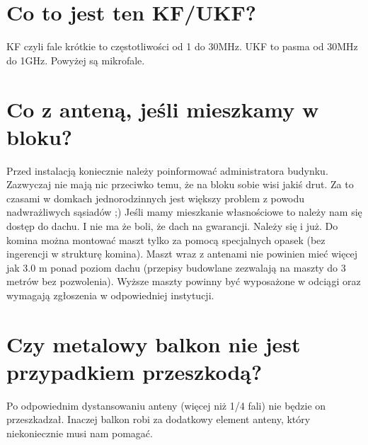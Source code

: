 \documentclass[a4paper,12pt]{article}
\begin{document}
\section{Co to jest ten KF/UKF?}
KF czyli fale krótkie to częstotliwości od 1 do 30MHz.
UKF to pasma od 30MHz do 1GHz.
Powyżej są mikrofale.

\section{Co z anteną, jeśli mieszkamy w bloku?}
Przed instalacją koniecznie należy poinformować administratora budynku. Zazwyczaj nie mają nic przeciwko temu, że na bloku sobie wisi jakiś drut. Za to czasami w domkach jednorodzinnych jest większy problem z powodu nadwrażliwych sąsiadów ;)
Jeśli mamy mieszkanie własnościowe to należy nam się dostęp do dachu. I nie ma że boli, że dach na gwarancji. Należy się i już.
Do komina można montować maszt tylko za pomocą specjalnych opasek (bez ingerencji w strukturę komina). Maszt wraz z antenami nie powinien mieć więcej jak 3.0 m ponad poziom dachu (przepisy budowlane zezwalają na maszty do 3 metrów bez pozwolenia). Wyższe maszty powinny być wyposażone w odciągi oraz wymagają zgłoszenia w odpowiedniej instytucji.

\section{Czy metalowy balkon nie jest przypadkiem przeszkodą?}
Po odpowiednim dystansowaniu anteny (więcej niż 1/4 fali) nie będzie on przeszkadzał. Inaczej balkon robi za dodatkowy element anteny, który niekoniecznie musi nam pomagać.
\end{document}
